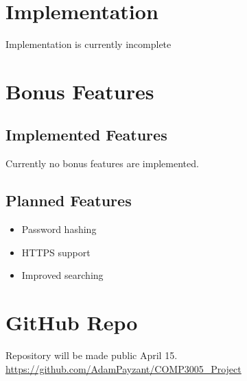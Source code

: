 \documentclass[titlepage, oneside]{article}
\begin{document}
    \section{Implementation}
        Implementation is currently incomplete
    \section{Bonus Features}
        \subsection{Implemented Features}
            Currently no bonus features are implemented.
        \subsection{Planned Features}
            \begin{itemize}
                \item Password hashing
                \item HTTPS support
                \item Improved searching
            \end{itemize}
    \section{GitHub Repo}
        Repository will be made public April 15. \\
        \url{https://github.com/AdamPayzant/COMP3005_Project}
\end{document}
